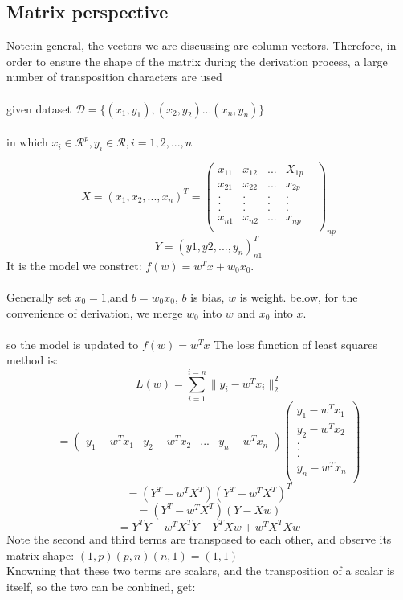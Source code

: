 \documentclass{report}
\begin{document}
\subsection{Matrix perspective}
Note:in general, the vectors we are discussing are column vectors. Therefore, in order to ensure the shape of the matrix during the derivation process, a large number of transposition characters are used\\\\
given dataset $\mathcal{D}=\{(x_1,y_1),(x_2,y_2)...(x_n, y_n)\}$\\\\
in which $x_i\in \mathcal{R}^p, y_i\in \mathcal{R}, i=1,2,...,n$

$$
X=(x_1,x_2,...,x_n)^T=\begin{pmatrix}
x_{11}&x_{12}&...&X_{1p}\\
x_{21}&x_{22}&...&x_{2p}\\
.&.&.&.&\\
.&.&.&.&\\
.&.&.&.&\\
x_{n1}&x_{n2}&...&x_{np}\\
\end{pmatrix}_{np}
$$
$$
Y=(y1,y2,...,y_n)_{n1}^T
$$
It is the model we constrct: $f(w)=w^Tx+w_0 x_0.$\\\\
Generally set $x_0=1$,and $b=w_0 x_0$, $b$ is bias, $w$ is weight. below, for the convenience of derivation, we merge $w_0$ into $w$ and $x_0$ into $x$.\\\\
so the model is updated to $f(w)=w^Tx$
The loss function of least squares method is:
$$
L(w)=\sum_{i=1}^{i=n}\|y_i-w^T x_i\|_2^2
$$
$$
=\begin{pmatrix}
y_1-w^Tx_1&y_2-w^Tx_2&...&y_n-w^Tx_n
\end{pmatrix}
\begin{pmatrix}
y_1-w^Tx_1\\
y_2-w^Tx_2\\
.\\
.\\
.\\
y_n-w^Tx_n\\
\end{pmatrix}
$$
$$
=(Y^T-w^TX^T)(Y^T-w^TX^T)^T
$$
$$
=(Y^T-w^TX^T)(Y-Xw)
$$
$$
=Y^TY-w^TX^TY-Y^TXw+w^TX^TXw
$$
Note the second and third terms are transposed to each other, and observe its matrix shape: $(1,p)(p,n)(n,1)=(1,1)$\\
Knowning that these two terms are scalars, and the transposition of a scalar is itself, so the two can be conbined, get:
\end{document}
